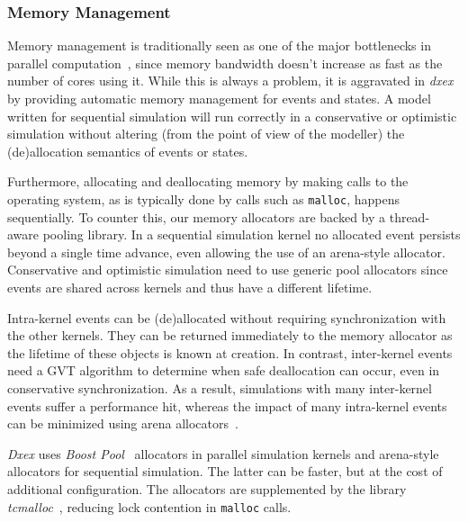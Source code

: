 \subsubsection{Memory Management}
\label{sec:4-subsec:overhead-pgraph:memory}
Memory management is traditionally seen as one of the major bottlenecks in parallel computation~\cite{Memory}, since memory bandwidth doesn't increase as fast as the number of cores using it.
While this is always a problem, it is aggravated in \textit{dxex} by providing automatic memory management for events and states.
A model written for sequential simulation will run correctly in a conservative or optimistic simulation without altering (from the point of view of the modeller) the (de)allocation semantics of events or states.

Furthermore, allocating and deallocating memory by making calls to the operating system, as is typically done by calls such as \texttt{malloc}, happens sequentially.
To counter this, our memory allocators are backed by a thread-aware pooling library.
In a sequential simulation kernel no allocated event persists beyond a single time advance, even allowing the use of an arena-style allocator.
Conservative and optimistic simulation need to use generic pool allocators since events are shared across kernels and thus have a different lifetime.

Intra-kernel events can be (de)allocated without requiring synchronization with the other kernels. 
They can be returned immediately to the memory allocator as the lifetime of these objects is known at creation.
In contrast, inter-kernel events need a GVT algorithm to determine when safe deallocation can occur, even in conservative synchronization.
As a result, simulations with many inter-kernel events suffer a performance hit, whereas the impact of many intra-kernel events can be minimized using arena allocators~\cite{Arena}.

\textit{Dxex} uses \textit{Boost Pool}~\cite{boostpool} allocators in parallel simulation kernels and arena-style allocators for sequential simulation.
The latter can be faster, but at the cost of additional configuration.
The allocators are supplemented by the library \textit{tcmalloc}~\cite{tcmalloc}, reducing lock contention in \texttt{malloc} calls.

